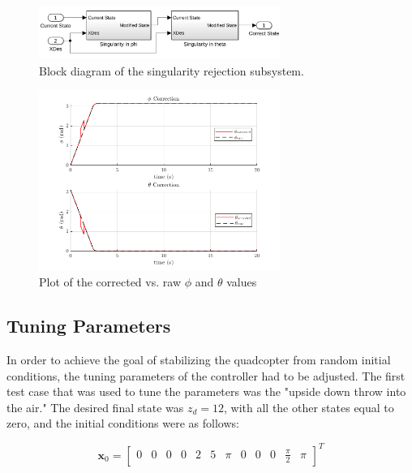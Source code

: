 \documentclass[12pt]{article}
\begin{document}
\begin{center}
\begin{figure}[H]
\captionsetup{width=1\textwidth}
\centering
\includegraphics[width=0.70\textwidth]{singularity_rejection2.png}
\caption{\label{fig:singularity_rejection}Block diagram of the singularity rejection subsystem.}
\end{figure}
\end{center}

\begin{center}
\begin{figure}[H]
\captionsetup{width=1\textwidth}
\centering
\includegraphics[width=0.70\textwidth]{singularity_rejection_plots.png}
\caption{\label{fig:singularity_rejection_plots}Plot of the corrected vs. raw $\phi$ and $\theta$ values}
\end{figure}
\end{center}


\subsection{Tuning Parameters} \label{sec:tuning}
In order to achieve the goal of stabilizing the quadcopter from random initial conditions, the tuning parameters of the controller had to be adjusted. The first test case that was used to tune the parameters was the "upside down throw into the air." The desired final state was $z_d = 12$, with all the other states equal to zero, and the initial conditions were as follows:

\begin{equation}
\bm x_0 = \begin{bmatrix}
0 & 0 & 0 & 0 & 2 & 5 & \pi & 0 & 0 & 0 & \frac{\pi}{2} & \pi
\end{bmatrix}^T
\end{equation}
\end{document}
